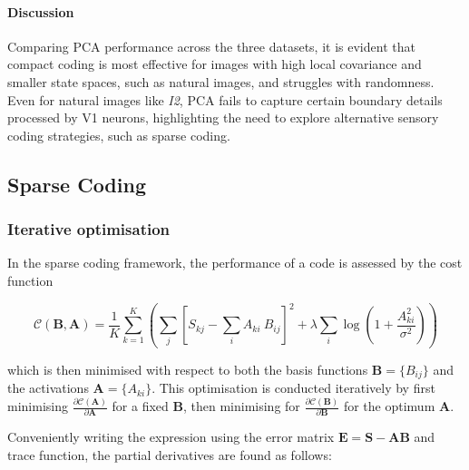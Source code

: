 \documentclass[11pt, twocolumn]{article}
\begin{document}
\paragraph{Discussion}
Comparing PCA performance across the three datasets, it is evident that compact coding is most effective for images with high local covariance and smaller state spaces, such as natural images, and struggles with randomness. Even for natural images like \textit{I2}, PCA fails to capture certain boundary details processed by V1 neurons, highlighting the need to explore alternative sensory coding strategies, such as sparse coding.

\vspace{-0.5em}

\subsection{Sparse Coding}
\subsubsection{Iterative optimisation}

\vspace{-1em}

In the sparse coding framework, the performance of a code is assessed by the cost function 

\vspace{-2em}

\begin{adjustwidth}{-1.5em}{}
\small
    \begin{equation}
        \label{eq:sparsecost}
        \mathcal{C}\left(\mathbf{B}, \mathbf{A}\right) = \frac{1}{K} \sum_{k=1}^K \left( \sum_j \left[ {S}_{kj} - \sum_i {A}_{ki} \: {B}_{ij} \right]^2
        + \lambda \sum_i \log\left(1+\frac{{A}_{ki}^2}{\sigma^2}\right) \right)
    \end{equation}
\end{adjustwidth}

which is then minimised with respect to both the basis functions $\mathbf{B} = \{{B}_{ij} \}$
and the activations $\mathbf{A} = \{{A}_{ki}\}$. This optimisation is conducted iteratively by first minimising $\frac{\partial \mathcal{C}(\mathbf{A})}{\partial \mathbf{A}}$ for a fixed $\mathbf{B}$, then minimising for $\frac{\partial \mathcal{C}(\mathbf{B})}{\partial \mathbf{B}}$ for the optimum $\mathbf{A}$.

Conveniently writing the expression using the error matrix $\mathbf{E} = \mathbf{S}-\mathbf{AB}$ and trace function, the partial derivatives are found as follows:
\end{document}
